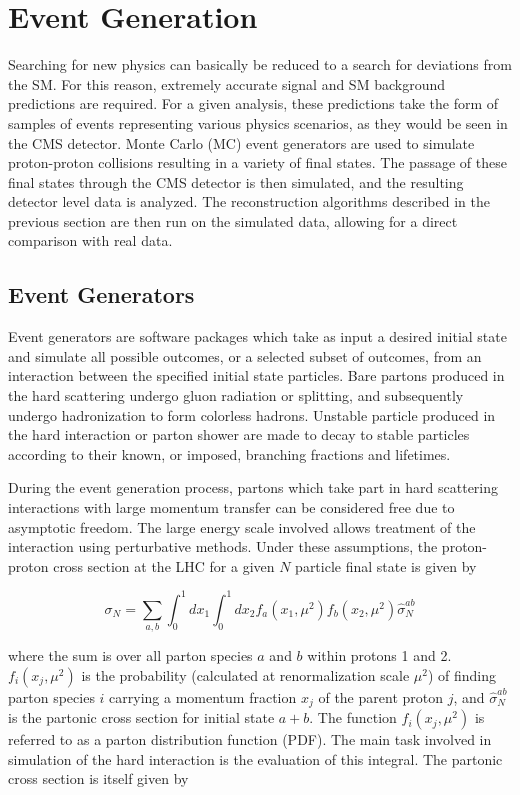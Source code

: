 \section{Event Generation}
Searching for new physics can basically be reduced to a search for deviations from the SM. For this reason, extremely accurate signal and SM background predictions are required. For a given analysis, these predictions take the form of samples of events representing various physics scenarios, as they would be seen in the CMS detector. Monte Carlo (MC) event generators are used to simulate proton-proton collisions resulting in a variety of final states. The passage of these final states through the CMS detector is then simulated, and the resulting detector level data is analyzed. The reconstruction algorithms described in the previous section are then run on the simulated data, allowing for a direct comparison with real data.

\subsection{Event Generators}
Event generators are software packages which take as input a desired initial state and simulate all possible outcomes, or a selected subset of outcomes, from an interaction between the specified initial state particles. Bare partons produced in the hard scattering undergo gluon radiation or splitting, and subsequently undergo hadronization to form colorless hadrons. Unstable particle produced in the hard interaction or parton shower are made to decay to stable particles according to their known, or imposed, branching fractions and lifetimes.

During the event generation process, partons which take part in hard scattering interactions with large momentum transfer can be considered free due to asymptotic freedom. The large energy scale involved allows treatment of the interaction using perturbative methods. Under these assumptions, the proton-proton cross section at the LHC for a given $N$ particle final state is given by

\begin{equation}
\sigma_{N} = \sum_{a,b}\int_{0}^{1}dx_{1}\int_{0}^{1}dx_{2}f_{a}(x_{1},\mu^{2})f_{b}(x_{2},\mu^{2})\hat{\sigma}_{N}^{ab}
\end{equation}

where the sum is over all parton species $a$ and $b$ within protons 1 and 2. $f_{i}(x_{j},\mu^{2})$ is the probability (calculated at renormalization scale $\mu^{2}$) of finding parton species $i$ carrying a momentum fraction $x_{j}$ of the parent proton $j$, and $\hat{\sigma}_{N}^{ab}$ is the partonic cross section for initial state $a+b$. The function $f_{i}(x_{j},\mu^{2})$ is referred to as a parton distribution function (PDF). The main task involved in simulation of the hard interaction is the evaluation of this integral. The partonic cross section is itself given by


